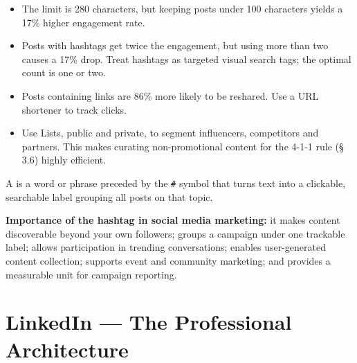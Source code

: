 \documentclass{MMTextbook}
\begin{document}
\begin{itemize}
\item {} The limit is 280 characters, but keeping
      posts under 100 characters yields a 17\% higher engagement rate.
\item {} Posts with hashtags get twice the engagement,
      but using more than two causes a 17\% drop. Treat hashtags as targeted
      visual search tags; the optimal count is one or two.
\item {} Posts containing links are 86\% more likely to be
      reshared. Use a URL shortener to track clicks.
\item {} Use Lists, public and private, to segment
      influencers, competitors and partners. This makes curating
      non-promotional content for the 4-1-1 rule (\S\,3.6) highly efficient.
\end{itemize}

\begin{definitionbox}[Hashtag]
A  is a word or phrase preceded by the \texttt{\#} symbol that
turns text into a clickable, searchable label grouping all posts on that topic.
\end{definitionbox}

\noindent\textbf{Importance of the hashtag in social media marketing:} it makes
content discoverable beyond your own followers; groups a campaign under one
trackable label; allows participation in trending conversations; enables
user-generated content collection; supports event and community marketing; and
provides a measurable unit for campaign reporting.

\section{LinkedIn --- The Professional Architecture}
\end{document}
